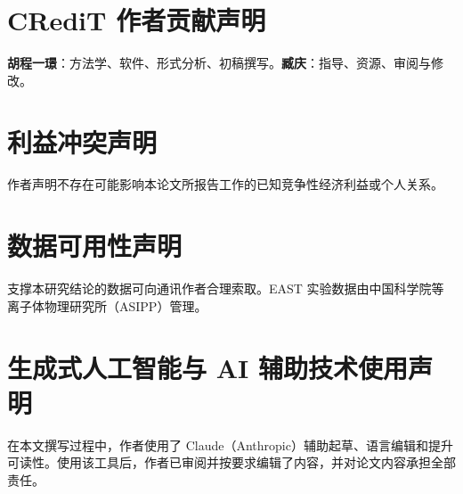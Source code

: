 \documentclass[a4paper,12pt]{ctexart}
\begin{document}
\section*{CRediT 作者贡献声明}

\textbf{胡程一璟}：方法学、软件、形式分析、初稿撰写。\textbf{臧庆}：指导、资源、审阅与修改。

\section*{利益冲突声明}

作者声明不存在可能影响本论文所报告工作的已知竞争性经济利益或个人关系。

\section*{数据可用性声明}

支撑本研究结论的数据可向通讯作者合理索取。EAST 实验数据由中国科学院等离子体物理研究所（ASIPP）管理。

\section*{生成式人工智能与 AI 辅助技术使用声明}

在本文撰写过程中，作者使用了 Claude（Anthropic）辅助起草、语言编辑和提升可读性。使用该工具后，作者已审阅并按要求编辑了内容，并对论文内容承担全部责任。
\end{document}
